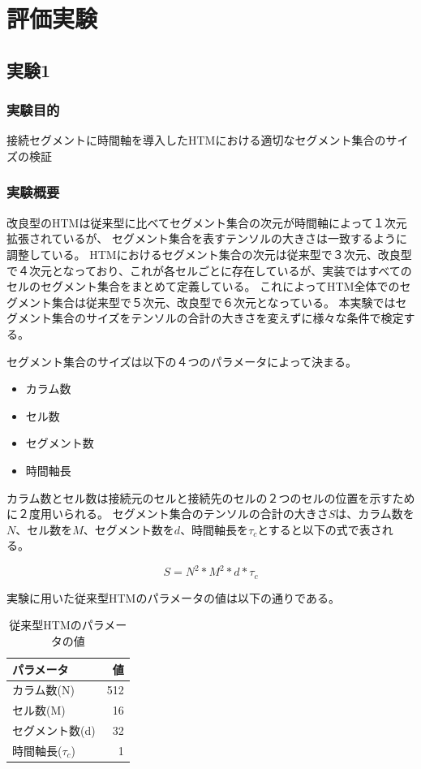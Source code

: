 \chapter{評価実験}

\section{実験1}
\subsection{実験目的}
接続セグメントに時間軸を導入したHTMにおける適切なセグメント集合のサイズの検証

\subsection{実験概要}
改良型のHTMは従来型に比べてセグメント集合の次元が時間軸によって１次元拡張されているが、
セグメント集合を表すテンソルの大きさは一致するように調整している。
HTMにおけるセグメント集合の次元は従来型で３次元、改良型で４次元となっており、これが各セルごとに存在しているが、実装ではすべてのセルのセグメント集合をまとめて定義している。
これによってHTM全体でのセグメント集合は従来型で５次元、改良型で６次元となっている。
本実験ではセグメント集合のサイズをテンソルの合計の大きさを変えずに様々な条件で検定する。

セグメント集合のサイズは以下の４つのパラメータによって決まる。
\begin{itemize}
  \item カラム数
  \item セル数
  \item セグメント数
  \item 時間軸長
\end{itemize}

カラム数とセル数は接続元のセルと接続先のセルの２つのセルの位置を示すために２度用いられる。
セグメント集合のテンソルの合計の大きさ$S$は、カラム数を$N$、セル数を$M$、セグメント数を$d$、時間軸長を$\tau_c$とすると以下の式で表される。

\begin{equation}
  S = N^2 * M^2 * d * \tau_c
\end{equation}

実験に用いた従来型HTMのパラメータの値は以下の通りである。
\begin{table}[hbtp]
  \caption{従来型HTMのパラメータの値}
  \label{old_htm_parameter}
  \centering
  \begin{tabular}{lr}
    \hline
    パラメータ & 値 \\
    \hline \hline
    カラム数(N) & 512 \\
    セル数(M) & 16 \\
    セグメント数(d) & 32 \\
    時間軸長($\tau_c$) & 1 \\
    \hline
  \end{tabular}
\end{table}


